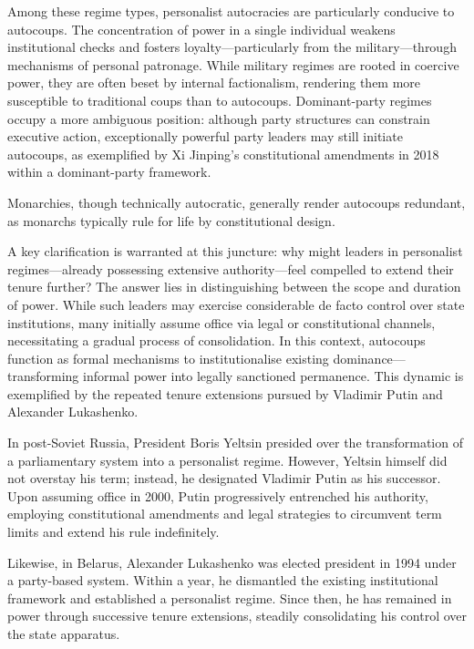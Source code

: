 \documentclass[
  12pt,
]{report}
\begin{document}
Among these regime types, personalist autocracies are particularly
conducive to autocoups. The concentration of power in a single
individual weakens institutional checks and fosters
loyalty---particularly from the military---through mechanisms of
personal patronage. While military regimes are rooted in coercive power,
they are often beset by internal factionalism, rendering them more
susceptible to traditional coups than to autocoups. Dominant-party
regimes occupy a more ambiguous position: although party structures can
constrain executive action, exceptionally powerful party leaders may
still initiate autocoups, as exemplified by Xi Jinping's constitutional
amendments in 2018 within a dominant-party framework.

Monarchies, though technically autocratic, generally render autocoups
redundant, as monarchs typically rule for life by constitutional design.

A key clarification is warranted at this juncture: why might leaders in
personalist regimes---already possessing extensive authority---feel
compelled to extend their tenure further? The answer lies in
distinguishing between the scope and duration of power. While such
leaders may exercise considerable de facto control over state
institutions, many initially assume office via legal or constitutional
channels, necessitating a gradual process of consolidation. In this
context, autocoups function as formal mechanisms to institutionalise
existing dominance---transforming informal power into legally sanctioned
permanence. This dynamic is exemplified by the repeated tenure
extensions pursued by Vladimir Putin and Alexander Lukashenko.

In post-Soviet Russia, President Boris Yeltsin presided over the
transformation of a parliamentary system into a personalist regime.
However, Yeltsin himself did not overstay his term; instead, he
designated Vladimir Putin as his successor. Upon assuming office in
2000, Putin progressively entrenched his authority, employing
constitutional amendments and legal strategies to circumvent term limits
and extend his rule indefinitely.

Likewise, in Belarus, Alexander Lukashenko was elected president in 1994
under a party-based system. Within a year, he dismantled the existing
institutional framework and established a personalist regime. Since
then, he has remained in power through successive tenure extensions,
steadily consolidating his control over the state apparatus.
\end{document}
